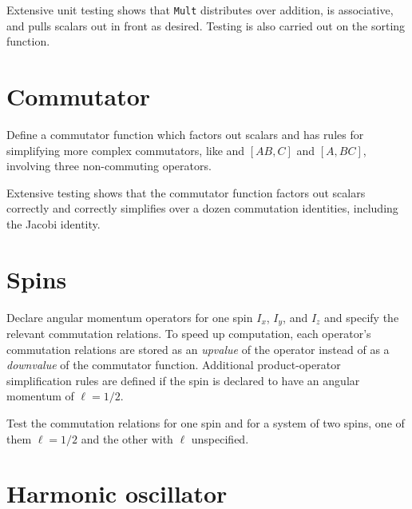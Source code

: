 \documentclass[12pt,letterpaper]{refart}
\begin{document}


Extensive unit testing shows that \verb+Mult+ distributes over addition, is associative, and pulls scalars out in front as desired.
Testing is also carried out on the sorting function.



\section{Commutator}

Define a commutator function which factors out scalars and has rules for simplifying more complex commutators, like and $[A B, C]$ and $[A, B C]$, involving three non-commuting operators.



Extensive testing shows that the commutator function factors out scalars correctly and correctly simplifies over a dozen commutation identities, including the Jacobi identity.



\section{Spins}

Declare angular momentum operators for one spin $I_x$, $I_y$, and $I_z$ and specify the relevant commutation relations.
To speed up computation, each operator's commutation relations are stored as an \emph{upvalue} of the operator instead of as a \emph{downvalue} of the commutator function.
Additional product-operator simplification rules are defined if the spin is declared to have an angular momentum of $\ell = 1/2$.



Test the commutation relations for one spin and for a system of two spins, one of them $\ell = 1/2$ and the other with $\ell$ unspecified.



\section{Harmonic oscillator}
\end{document}
